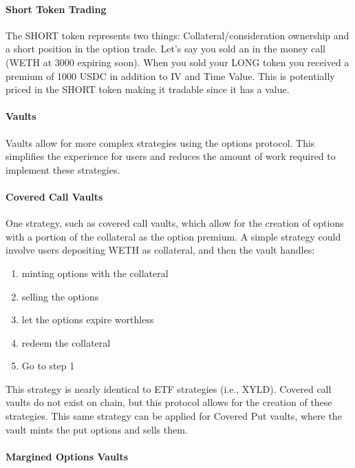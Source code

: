 \documentclass[%
 reprint,
 amsmath,amssymb,
 aps,
]{revtex4-2}
\begin{document}
\paragraph*{Short Token Trading}

The SHORT token represents two things:
Collateral/consideration ownership and a short position in the option
trade. Let's say you sold an in the money call (WETH at 3000 expiring
soon). When you sold your LONG token you received a premium of 1000 USDC
in addition to IV and Time Value. This is potentially priced in the
SHORT token making it tradable since it has a value.

\paragraph*{Vaults}

Vaults allow for more complex strategies using the options protocol.
This simplifies the experience for users and reduces the amount of work
required to implement these strategies.

\paragraph*{Covered Call Vaults}

One strategy, such as covered call vaults, which allow for the creation
of options with a portion of the collateral as the option premium. A
simple strategy could involve users depositing WETH as collateral, and
then the vault handles:
\begin{enumerate}
\item minting options with the collateral
\item selling the options
\item let the options expire worthless
\item redeem the collateral
\item Go to step 1
\end{enumerate}

This strategy is nearly identical to ETF strategies (i.e., XYLD). Covered
call vaults do not exist on chain, but this protocol allows for the
creation of these strategies. This same strategy can be applied for
Covered Put vaults, where the vault mints the put options and sells
them.

\paragraph*{Margined Options Vaults}
\end{document}
